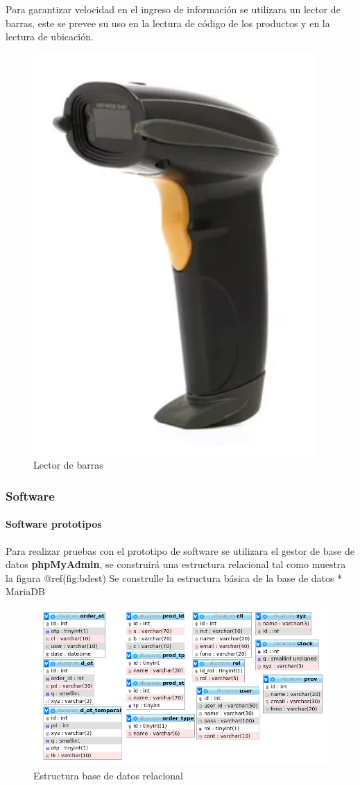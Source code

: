 \documentclass[
]{article}
\begin{document}
Para garantizar velocidad en el ingreso de información se utilizara un
lector de barras, este se prevee su uso en la lectura de código de los
productos y en la lectura de ubicación.

\begin{figure}[H]

{\centering \includegraphics[width=0.2\linewidth]{marco teorico/image/lectorbar} 

}

\caption{Lector de barras}\label{fig:unnamed-chunk-15}
\end{figure}

\hypertarget{software}{%
\subsubsection{Software}\label{software}}

\hypertarget{software-prototipos}{%
\paragraph{Software prototipos}\label{software-prototipos}}

Para realizar pruebas con el prototipo de software se utilizara el
gestor de base de datos \textbf{phpMyAdmin}, se construirá una
estructura relacional tal como muestra la figura @ref(fig:bdest) Se
construlle la estructura básica de la base de datos * MariaDB

\begin{figure}[H]

{\centering \includegraphics[width=1\linewidth]{marco teorico/Screenshot from 2021-11-01 20-35-27} 

}

\caption{Estructura base de datos relacional}\label{fig:unnamed-chunk-16}
\end{figure}
\end{document}
